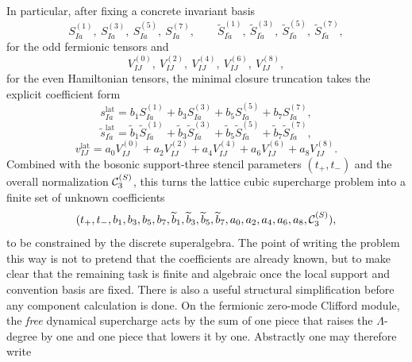 \documentclass[11pt]{article}
\numberwithin{equation}{section}
\begin{document}
In particular, after fixing a concrete invariant basis
\begin{equation}
\label{eq:s15-011}
S^{(1)}_{I\dot a},\ S^{(3)}_{I\dot a},\ S^{(5)}_{I\dot a},\ S^{(7)}_{I\dot a},
\qquad
\widetilde S^{(1)}_{I\widetilde a},\ \widetilde S^{(3)}_{I\widetilde a},\ \widetilde S^{(5)}_{I\widetilde a},\ \widetilde S^{(7)}_{I\widetilde a},
\end{equation}
for the odd fermionic tensors and
\begin{equation}
\label{eq:s15-012}
V^{(0)}_{IJ},\ V^{(2)}_{IJ},\ V^{(4)}_{IJ},\ V^{(6)}_{IJ},\ V^{(8)}_{IJ},
\end{equation}
for the even Hamiltonian tensors, the minimal closure truncation takes the explicit coefficient form
\begin{equation}
\label{eq:s15-013}
s^{\mathrm{lat}}_{I\dot a}
=
b_1 S^{(1)}_{I\dot a}
+b_3 S^{(3)}_{I\dot a}
+b_5 S^{(5)}_{I\dot a}
+b_7 S^{(7)}_{I\dot a},
\end{equation}
\begin{equation}
\label{eq:s15-014}
\widetilde s^{\mathrm{lat}}_{I\widetilde a}
=
\widetilde b_1 \widetilde S^{(1)}_{I\widetilde a}
+\widetilde b_3 \widetilde S^{(3)}_{I\widetilde a}
+\widetilde b_5 \widetilde S^{(5)}_{I\widetilde a}
+\widetilde b_7 \widetilde S^{(7)}_{I\widetilde a},
\end{equation}
\begin{equation}
\label{eq:s15-015}
v^{\mathrm{lat}}_{IJ}
=
a_0 V^{(0)}_{IJ}
+a_2 V^{(2)}_{IJ}
+a_4 V^{(4)}_{IJ}
+a_6 V^{(6)}_{IJ}
+a_8 V^{(8)}_{IJ}.
\end{equation}
Combined with the bosonic support-three stencil parameters $(t_+,t_-)$ and the overall normalization ${\cal C}_3^{(S)}$, this turns the lattice cubic supercharge problem into a finite set of unknown coefficients
\begin{equation}
\label{eq:s15-016}
(t_+,t_-,b_1,b_3,b_5,b_7,\widetilde b_1,\widetilde b_3,\widetilde b_5,\widetilde b_7,a_0,a_2,a_4,a_6,a_8,{\cal C}_3^{(S)}),
\end{equation}
to be constrained by the discrete superalgebra. The point of writing the problem this way is not to pretend that the coefficients are already known, but to make clear that the remaining task is finite and algebraic once the local support and convention basis are fixed.
There is also a useful structural simplification before any component calculation is done. On the fermionic zero-mode Clifford module, the \emph{free} dynamical supercharge acts by the sum of one piece that raises the $\Lambda$-degree by one and one piece that lowers it by one. Abstractly one may therefore write
\end{document}
